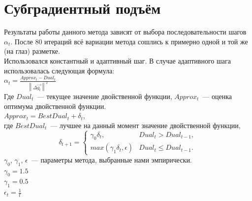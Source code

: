 \documentclass{article}
\begin{document}
\section{Субградиентный подъём}
Результаты работы данного метода зависят от выбора
последовательности шагов $\alpha_t$.
После 80 итераций всё вариации метода сошлись к
примерно одной и той же (на глаз) разметке.\\
Использовался константный и адаптивный шаг.
В случае адаптивного шага использовалась следующая формула:\\
$\alpha_t = \frac{Approx_t - Dual_t}{\left \| \Delta \overrightarrow{g_t} \right \|^2}$\\
Где $Dual_t$~--- текущее значение двойственной функции, 
$Approx_t$~--- оценка оптимума двойственной функции.\\
$Approx_t = BestDual_t + \delta_t$,\\
где $BestDual_t$~--- лучшее на данный момент значение двойственной функции,\\
\begin{equation}
    \delta_{t+1} = \begin{cases}
    \gamma_0 \delta_t, & Dual_t > Dual_{t-1},\\
    max(\gamma_1 \delta_t, \epsilon) & Dual_t \leqslant  Dual_{t-1}.
    \end{cases}
\end{equation}
$\gamma_0$, $\gamma_1$, $\epsilon$~--- параметры метода, выбранные нами эмпирически.\\
$\gamma_0 = 1.5$\\
$\gamma_1 = 0.5$\\
$\epsilon_t = \frac{1}{t}$\\
\end{document}
